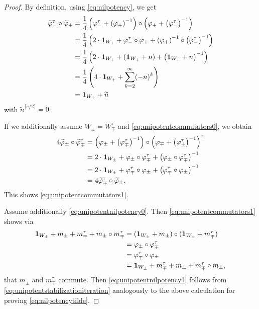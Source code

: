 \documentclass[a4paper,12pt,reqno]{amsart}
\theoremstyle{plain}
\theoremstyle{remark}
\begin{document}
    \begin{proof}
      By definition, using \eqref{eq:nilpotency}, we get
      \begin{align*}
        \widetilde{\varphi}_-^\tau\circ\widetilde{\varphi}_+ &=
        \frac{1}{4}\left(\varphi_-^\tau+\left(\varphi_+\right)^{-1}\right)
        \circ \left(\varphi_++\left(\varphi_-^\tau\right)^{-1}\right)\\
        &=
        \frac{1}{4}\left(2\cdot{\bf1}_{W_+}+\varphi_-^\tau\circ\varphi_++\left(\varphi_+\right)^{-1}\circ\left(\varphi_-^\tau\right)^{-1}\right)\\
        &=
        \frac{1}{4}\left(2\cdot{\bf1}_{W_+}+({\bf1}_{W_+}+n)+\left({\bf1}_{W_+}+n\right)^{-1}\right)\\
        &=
        \frac{1}{4}\left(4\cdot{\bf1}_{W_+}+\sum_{k=2}^\infty(-n)^k\right)\\
        &=
        {\bf1}_{W_+}+\widetilde{n}
      \end{align*}
      with $\widetilde{n}^{\lceil e/2 \rceil}=0$.

      If we additionally assume $W_\pm = W_\mp^\tau$ and \eqref{eq:unipotentcommutators0}, we obtain
      \begin{align*}
        4\widetilde{\varphi}_\pm\circ\widetilde{\varphi}_\mp^\tau
        &=\left(\varphi_\pm+\left(\varphi_\mp^\tau\right)^{-1}\right)\circ \left(\varphi_\mp+\left(\varphi_\pm^\tau\right)^{-1}\right)^\tau\\
        &=2\cdot{\bf1}_{W_\pm}+\varphi_\pm\circ\varphi_\mp^\tau+\left(\varphi_\pm\circ\varphi_\mp^\tau\right)^{-1}\\
        &=2\cdot{\bf1}_{W_\pm}+\varphi_\mp^\tau\circ\varphi_\pm+\left(\varphi_\mp^\tau\circ\varphi_\pm\right)^{-1}\\
        &=4\widetilde{\varphi}_\mp^\tau\circ\widetilde{\varphi}_\pm.
      \end{align*}
      This shows \eqref{eq:unipotentcommutators1}.

      Assume additionally \eqref{eq:unipotentnilpotency0}. Then \eqref{eq:unipotentcommutators1} shows via
      \begin{align*}
        {\bf1}_{W_\pm}+m_{\pm}+m_{\mp}^\tau+m_{\pm}\circ m_{\mp}^\tau
        &=
        ({\bf1}_{W_\pm}+m_{\pm})\circ
        ({\bf1}_{W_\pm}+m_{\mp}^\tau)\\
        &=
        \varphi_\pm\circ\varphi_\mp^\tau\\
        &=
        \varphi_\mp^\tau\circ\varphi_\pm\\
        &=
        {\bf1}_{W_\pm}+m_{\mp}^\tau+m_{\pm}+m_{\mp}^\tau\circ m_{\pm},
      \end{align*}
      that $m_\pm$ and $m_{\mp}^\tau$ commute. Then \eqref{eq:unipotentnilpotency1} follows from \eqref{eq:unipotentstabilizationiteration} analogously to the above calculation for proving \eqref{eq:nilpotencytilde}.
    \end{proof}
\end{document}
